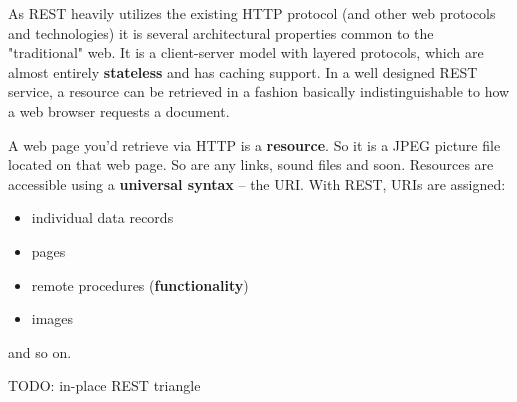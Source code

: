 \documentclass{article}
\begin{document}
As REST heavily utilizes the existing HTTP protocol (and other web protocols and technologies) it is several architectural properties common to the "traditional" web. It is a client-server model with layered protocols, which are almost entirely \textbf{stateless} and has caching support. In a well designed REST service, a resource can be retrieved in a fashion basically indistinguishable to how a web browser requests a document. 

A web page you'd retrieve via HTTP is a \textbf{resource}. So it is a JPEG picture file located on that web page. So are any links, sound files and soon. Resources are accessible using a \textbf{universal syntax} -- the URI. With REST, URIs are assigned:
\begin{itemize}
	\item individual data records
	\item pages
	\item remote procedures (\textbf{functionality})
	\item images
\end{itemize}
and so on.

TODO: in-place REST triangle
\end{document}
